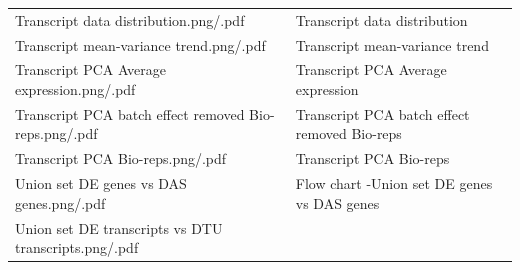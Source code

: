 \documentclass[]{article}
\begin{document}
\begin{longtable}[]{@{}ll@{}}
\begin{minipage}[t]{0.51\columnwidth}\raggedright\strut
Transcript data distribution.png/.pdf\strut
\end{minipage} & \begin{minipage}[t]{0.43\columnwidth}\raggedright\strut
Transcript data distribution\strut
\end{minipage}\tabularnewline
\begin{minipage}[t]{0.51\columnwidth}\raggedright\strut
Transcript mean-variance trend.png/.pdf\strut
\end{minipage} & \begin{minipage}[t]{0.43\columnwidth}\raggedright\strut
Transcript mean-variance trend\strut
\end{minipage}\tabularnewline
\begin{minipage}[t]{0.51\columnwidth}\raggedright\strut
Transcript PCA Average expression.png/.pdf\strut
\end{minipage} & \begin{minipage}[t]{0.43\columnwidth}\raggedright\strut
Transcript PCA Average expression\strut
\end{minipage}\tabularnewline
\begin{minipage}[t]{0.51\columnwidth}\raggedright\strut
Transcript PCA batch effect removed Bio-reps.png/.pdf\strut
\end{minipage} & \begin{minipage}[t]{0.43\columnwidth}\raggedright\strut
Transcript PCA batch effect removed Bio-reps\strut
\end{minipage}\tabularnewline
\begin{minipage}[t]{0.51\columnwidth}\raggedright\strut
Transcript PCA Bio-reps.png/.pdf\strut
\end{minipage} & \begin{minipage}[t]{0.43\columnwidth}\raggedright\strut
Transcript PCA Bio-reps\strut
\end{minipage}\tabularnewline
\begin{minipage}[t]{0.51\columnwidth}\raggedright\strut
Union set DE genes vs DAS genes.png/.pdf\strut
\end{minipage} & \begin{minipage}[t]{0.43\columnwidth}\raggedright\strut
Flow chart -Union set DE genes vs DAS genes\strut
\end{minipage}\tabularnewline
\begin{minipage}[t]{0.51\columnwidth}\raggedright\strut
Union set DE transcripts vs DTU transcripts.png/.pdf\strut
\end{minipage} & \begin{minipage}[t]{0.43\columnwidth}\raggedright\strut

\end{minipage}
\end{longtable}
\end{document}
